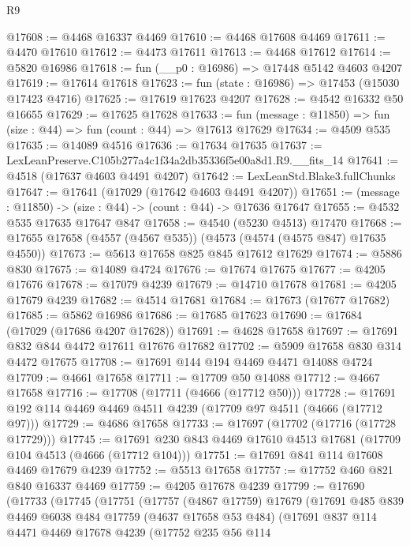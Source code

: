 \begin{lexlean}{R9}
\begin{coremodule}
@17608 := @4468 @16337 @4469
@17610 := @4468 @17608 @4469
@17611 := @4470 @17610
@17612 := @4473 @17611
@17613 := @4468 @17612
@17614 := @5820 @16986
@17618 := fun (__p0 : @16986) => @17448 @5142 @4603 @4207
@17619 := @17614 @17618
@17623 := fun (state : @16986) => @17453 (@15030 @17423 @4716)
@17625 := @17619 @17623 @4207
@17628 := @4542 @16332 @50 @16655
@17629 := @17625 @17628
@17633 := fun (message : @11850) => fun (size : @44) => fun (count : @44) => @17613 @17629
@17634 := @4509 @535
@17635 := @14089 @4516
@17636 := @17634 @17635
@17637 := LexLeanPreserve.C105b277a4c1f34a2db35336f5e00a8d1.R9.__fits_14
@17641 := @4518 (@17637 @4603 @4491 @4207)
@17642 := LexLeanStd.Blake3.fullChunks
@17647 := @17641 (@17029 (@17642 @4603 @4491 @4207))
@17651 := (message : @11850) -> (size : @44) -> (count : @44) -> @17636 @17647
@17655 := @4532 @535 @17635 @17647 @847
@17658 := @4540 (@5230 @4513) @17470
@17668 := @17655 @17658 (@4557 (@4567 @535)) (@4573 (@4574 (@4575 @847) @17635 @4550))
@17673 := @5613 @17658 @825 @845 @17612 @17629
@17674 := @5886 @830
@17675 := @14089 @4724
@17676 := @17674 @17675
@17677 := @4205 @17676
@17678 := @17079 @4239
@17679 := @14710 @17678
@17681 := @4205 @17679 @4239
@17682 := @4514 @17681
@17684 := @17673 (@17677 @17682)
@17685 := @5862 @16986
@17686 := @17685 @17623
@17690 := @17684 (@17029 (@17686 @4207 @17628))
@17691 := @4628 @17658
@17697 := @17691 @832 @844 @4472 @17611 @17676 @17682
@17702 := @5909 @17658 @830 @314 @4472 @17675
@17708 := @17691 @144 @194 @4469 @4471 @14088 @4724
@17709 := @4661 @17658
@17711 := @17709 @50 @14088
@17712 := @4667 @17658
@17716 := @17708 (@17711 (@4666 (@17712 @50)))
@17728 := @17691 @192 @114 @4469 @4469 @4511 @4239 (@17709 @97 @4511 (@4666 (@17712 @97)))
@17729 := @4686 @17658
@17733 := @17697 (@17702 (@17716 (@17728 @17729)))
@17745 := @17691 @230 @843 @4469 @17610 @4513 @17681 (@17709 @104 @4513 (@4666 (@17712 @104)))
@17751 := @17691 @841 @114 @17608 @4469 @17679 @4239
@17752 := @5513 @17658
@17757 := @17752 @460 @821 @840 @16337 @4469
@17759 := @4205 @17678 @4239
@17799 := @17690
    (@17733
      (@17745
        (@17751
          (@17757
            (@4867 @17759)
            @17679
            (@17691
              @485
              @839
              @4469
              @6038
              @484
              @17759
              (@4637 @17658 @53 @484)
              (@17691
                @837
                @114
                @4471
                @4469
                @17678
                @4239
                (@17752
                  @235
                  @56
                  @114

\end{coremodule}
\end{lexlean}
